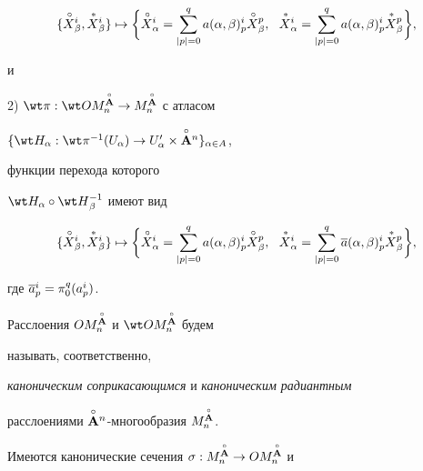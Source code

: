 \begin{equation}


\label{n.2}


\{{\puto X}{}_\beta^i,{\puts X}{}_\beta^i\} \mapsto


\bigg\{{\puto X}{}_\alpha^i= \sum_{|p|=0}^q a(\alpha, \beta)_p^i


{\puto X}{}_\beta^p, \ \ 


{\puts X}{}^i_\alpha =\sum_{|p|=0}^q a(\alpha, \beta)_p^i


{\puts X}{}_\beta^p\bigg\},


\end{equation}


и





2) $\wt\pi:\wt O{M^{\Ao}_n}\to {M^{\Ao}_n}$ с атласом


$\{\wt H_\alpha : \wt\pi{}^{-1}(U_\alpha) \to


U'_\alpha\times\Aon\}_{\alpha\in A}$,


функции перехода которого


$\wt H_{\alpha}\circ \wt H{}^{-1}_{\beta}$ имеют вид


\begin{equation}


\label{n.3}


\{{\puto X}{}^i_\beta,{\puts X}{}^i_\beta\} \mapsto


\bigg\{{\puto X}{}_\alpha^i= \sum_{|p|=0}^q a(\alpha, \beta)_p^i


{\puto X}{}_\beta^p,


\ \ {\puts X}{}_\alpha^i =\sum_{|p|=0}^q \overline{a}(\alpha, \beta)_p^i


{\puts X}{}_\beta^p\bigg\},


\end{equation}


где $\overline{a}{}_p^i = {\pi^q_0} (a_p^i)$.





Расслоения $O{M^{\overset{\circ}{\bold A}{}}_n}$ и $\wt O{M^{\Ao}_n}$ будем


называть, соответственно,


{\it каноническим соприкасающимся} и {\it каноническим радиантным}


расслоениями $\overset{\circ}{\bold A}{}^n$-многообразия ${M^{\overset{\circ}{\bold A}{}}_n}$.





Имеются канонические сечения $\sigma: M^{\overset{\circ}{\bold A}{}}_n\to OM^{\overset{\circ}{\bold A}{}}_n$ и


